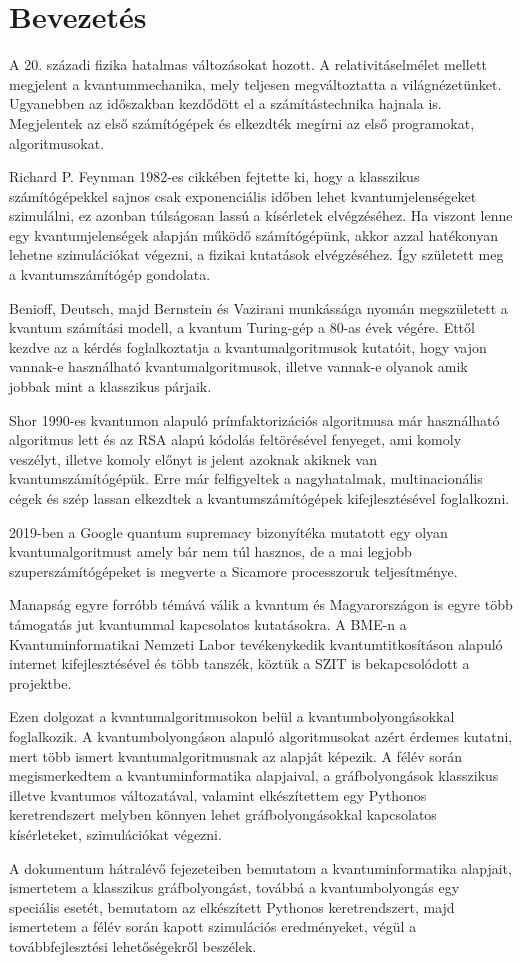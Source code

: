 \chapter{Bevezetés}

A 20. századi fizika hatalmas változásokat hozott. A relativitáselmélet mellett
megjelent a kvantummechanika, mely teljesen megváltoztatta a világnézetünket.
Ugyanebben az időszakban kezdődött el a számítástechnika hajnala is. Megjelentek
az első számítógépek és elkezdték megírni az első programokat, algoritmusokat.

Richard P. Feynman 1982-es cikkében fejtette ki, hogy a klasszikus számítógépekkel
sajnos csak exponenciális időben lehet kvantumjelenségeket szimulálni, ez azonban
túlságosan lassú a kísérletek elvégzéséhez. Ha viszont lenne egy kvantumjelenségek
alapján működő számítógépünk, akkor azzal hatékonyan lehetne szimulációkat végezni,
a fizikai kutatások elvégzéséhez. Így született meg a kvantumszámítógép gondolata.

Benioff, Deutsch, majd Bernstein és Vazirani munkássága nyomán megszületett a
kvantum számítási modell, a kvantum Turing-gép a 80-as évek végére. Ettől kezdve
az a kérdés foglalkoztatja a kvantumalgoritmusok kutatóit, hogy vajon vannak-e
használható kvantumalgoritmusok, illetve vannak-e olyanok amik jobbak mint a
klasszikus párjaik.

Shor 1990-es kvantumon alapuló prímfaktorizációs algoritmusa már használható
algoritmus lett és az RSA alapú kódolás feltörésével fenyeget, ami komoly
veszélyt, illetve komoly előnyt is jelent azoknak akiknek van kvantumszámítógépük.
Erre már felfigyeltek a nagyhatalmak, multinacionális cégek és szép lassan elkezdtek
a kvantumszámítógépek kifejlesztésével foglalkozni.

2019-ben a Google quantum supremacy bizonyítéka mutatott egy olyan kvantumalgoritmust
amely bár nem túl hasznos, de a mai legjobb szuperszámítógépeket is megverte a
Sicamore processzoruk teljesítménye.

Manapság egyre forróbb témává válik a kvantum és Magyarországon is egyre több
támogatás jut kvantummal kapcsolatos kutatásokra. A BME-n a Kvantuminformatikai
Nemzeti Labor tevékenykedik kvantumtitkosításon alapuló internet kifejlesztésével
és több tanszék, köztük a SZIT is bekapcsolódott a projektbe.

Ezen dolgozat a kvantumalgoritmusokon belül a kvantumbolyongásokkal foglalkozik.
A kvantumbolyongáson alapuló algoritmusokat azért érdemes kutatni, mert több
ismert kvantumalgoritmusnak az alapját képezik. A félév során megismerkedtem a
kvantuminformatika alapjaival, a gráfbolyongások klasszikus illetve kvantumos
változatával, valamint elkészítettem egy Pythonos keretrendszert melyben könnyen lehet
gráfbolyongásokkal kapcsolatos kísérleteket, szimulációkat végezni.

A dokumentum hátralévő fejezeteiben bemutatom a kvantuminformatika alapjait,
ismertetem a klasszikus gráfbolyongást, továbbá a kvantumbolyongás egy speciális
esetét, bemutatom az elkészített Pythonos keretrendszert, majd ismertetem
a félév során kapott szimulációs eredményeket, végül a továbbfejlesztési
lehetőségekről beszélek.
